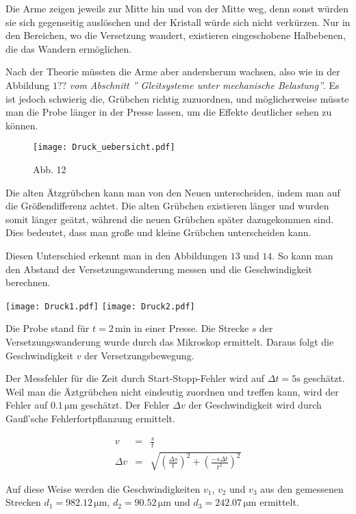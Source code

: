 \documentclass[12pt,a4paper]{scrartcl}
\numberwithin{equation}{section} %
\renewcommand{\[}{} %
\renewcommand{\]}{\noindent} %
\begin{document}
Die Arme zeigen jeweils zur Mitte hin und von der Mitte weg, denn sonst
würden sie sich gegenseitig auslöschen und der Kristall würde sich nicht
verkürzen. Nur in den Bereichen, wo die Versetzung wandert, existieren
eingeschobene Halbebenen, die das Wandern ermöglichen.

Nach der Theorie müssten die Arme aber andersherum wachsen, also wie in
der Abbildung \(1??\) \emph{vom Abschnitt '' Gleitsysteme unter
mechanische Belastung''}. Es ist jedoch schwierig die, Grübchen richtig
zuzuordnen, und möglicherweise müsste man die Probe länger in der Presse
lassen, um die Effekte deutlicher sehen zu können.

\begin{figure}
\centering
\texttt{[image: Druck\_uebersicht.pdf]}
\caption{Abb. 12}
\end{figure}

Die alten Ätzgrübchen kann man von den Neuen unterscheiden, indem man
auf die Größendifferenz achtet. Die alten Grübchen existieren länger und
wurden somit länger geätzt, während die neuen Grübchen später
dazugekommen sind. Dies bedeutet, dass man große und kleine Grübchen
unterscheiden kann.

Diesen Unterschied erkennt man in den Abbildungen \(13\) und \(14\). So
kann man den Abstand der Versetzungswanderung messen und die
Geschwindigkeit berechnen.

\texttt{[image: Druck1.pdf]} \texttt{[image: Druck2.pdf]}

Die Probe stand für \(t=2\mathrm{\,min}\) in einer Presse. Die Strecke
\(s\) der Versetzungswanderung wurde durch das Mikroskop ermittelt.
Daraus folgt die Geschwindigkeit \(v\) der Versetzungsbewegung.

Der Messfehler für die Zeit durch Start-Stopp-Fehler wird auf
\(\Delta t=5\mathrm s\) geschätzt. Weil man die Äztgrübchen nicht
eindeutig zuordnen und treffen kann, wird der Fehler auf
\(0.1\mathrm{\,\mu m}\) geschätzt. Der Fehler \(\Delta v\) der
Geschwindigkeit wird durch Gauß'sche Fehlerfortpflanzung ermittelt.

\[
\begin{eqnarray}
    v &=& \frac{s}{t} \\
    \Delta v &=&
        \sqrt{
            \left(\frac{\Delta s}{t}\right)^2
            + \left(\frac{-s \Delta t}{t^2}\right)^2
        }
\end{eqnarray}
\]

Auf diese Weise werden die Geschwindigkeiten \(v_1\), \(v_2\) und
\(v_3\) aus den gemessenen Strecken \(d_1=982.12\mathrm{\,\mu m}\),
\(d_2=90.52\mathrm{\,\mu m}\) und \(d_3=242.07\mathrm{\,\mu m}\)
ermittelt.
\end{document}
